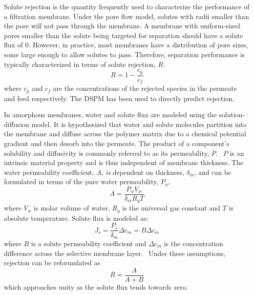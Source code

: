  Solute rejection is the quantity frequently used to characterize the performance of a 
  filtration membrane. Under the pore flow model, solutes with radii smaller than the 
  pore will not pass through the membrane. A membrane with uniform-sized pores smaller
  than the solute being targeted for separation should have a solute flux of 0. However,
  in practice, most membranes have a distribution of pore sizes, some large enough to
  allow solutes to pass. Therefore, separation performance is typically characterized
  in terms of solute rejection, $R$. 
  \begin{equation}
     R = 1 - \frac{c_p}{c_f}
  \end{equation}
  where $c_p$ and $c_f$ are the concentrations of the rejected species in the permeate
  and feed respectively. The DSPM has been used to directly predict 
  rejection.~\cite{hatakeyama_water_2011,bowen_modelling_2002}
  
  In amorphous membranes, water and solute flux are modeled using the solution-diffusion 
  model. It is hypothesized that water and solute molecules partition into the
  membrane and diffuse across the polymer matrix due to a chemical potential gradient
  and then desorb into the permeate. The product of a component's solubility and 
  diffusivity is commonly referred to as its permeability, $P$.~\cite{wijmans_solution-diffusion_1995}
  $P$ is an intrinsic material property and is thus independent of membrane thickness.  %
  The water permeability coefficient, $A$, \textit{is} dependent on thickness, $\delta_m$,
  and can be formulated in terms of the pure water permeability, $P_w$.
  \begin{equation}
    A = \frac{P_wV_w}{\delta_mR_gT}
  \end{equation}
  where $V_w$ is molar volume of water, $R_g$ is the universal gas constant and $T$ is
  absolute temperature. Solute flux is modeled as:
  \begin{equation}
    J_s = \frac{P_s}{\delta_m}\Delta c_m = B\Delta c_m
  \end{equation}
  where $B$ is a solute permeability coefficient and $\Delta c_m$ is the concentration
  difference across the selective membrane layer.~\cite{geise_fundamental_2014}
  Under these assumptions, rejection can be reformulated as
  \begin{equation}
    R = \frac{A}{A + B}
  \end{equation}
  which approaches unity as the solute flux tends towards zero.~\cite{van_der_bruggen_review_2003}
  
